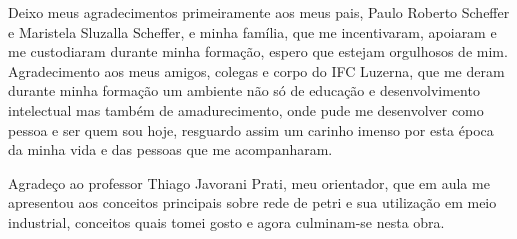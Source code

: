 \begin{agradecimentos}
Deixo meus agradecimentos primeiramente aos meus pais, Paulo Roberto Scheffer e Maristela Sluzalla Scheffer, e minha família, que me incentivaram, apoiaram e me custodiaram durante minha formação, espero que estejam orgulhosos de mim. Agradecimento aos meus amigos, colegas e corpo do IFC Luzerna, que me deram durante minha formação um ambiente não só de educação e desenvolvimento intelectual mas também de amadurecimento, onde pude me desenvolver como pessoa e ser quem sou hoje, resguardo assim um carinho imenso por esta época da minha vida e das pessoas que me acompanharam.

Agradeço ao professor Thiago Javorani Prati, meu orientador, que em aula me apresentou aos conceitos principais sobre rede de petri e sua utilização em meio industrial, conceitos quais tomei gosto e agora culminam-se nesta obra.

\end{agradecimentos}